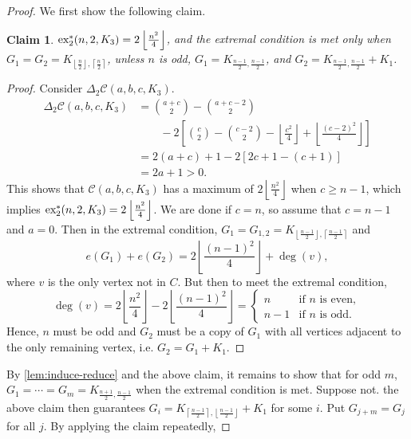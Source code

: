 \documentclass[12pt]{report}
\newtheorem{claim}{Claim}[theorem]
\newcommand*{\dex}{\textnormal{ex}_2}
\newcommand*{\con}{\mathcal{C}}
\begin{document}
\begin{proof}
  
  We first show the following claim.

  \begin{claim}\label{claim:induce-triangle}
    $\dex^*(n, 2, K_3) = 2\left\lfloor\frac{n^2}{4}\right\rfloor$, and the extremal condition is met only when $G_1 = G_2 = K_{\left\lfloor\frac{n}{2}\right\rfloor, \left\lceil\frac{n}{2}\right\rceil}$, unless $n$ is odd, $G_1 = K_{\frac{n - 1}{2}, \frac{n - 1}{2}}$, and $G_2 = K_{\frac{n - 1}{2}, \frac{n - 1}{2}} + K_1$.
  \end{claim}

  \begin{proof}
    Consider $\Delta_2 \con(a, b, c, K_3)$.
    \begin{align*}
      \Delta_2 \con(a, b, c, K_3)
      &= \binom{a + c}{2} - \binom{a + c - 2}{2} \\
      &\qquad - 2\left[\binom{c}{2} - \binom{c - 2}{2} - \left\lfloor\frac{c^2}{4}\right\rfloor + \left\lfloor\frac{(c - 2)^2}{4}\right\rfloor\right] \\
      &= 2(a + c) + 1 - 2[2c + 1 - (c + 1)] \\
      &= 2a + 1 > 0.
    \end{align*}
    This shows that $\con(a, b, c, K_3)$ has a maximum of $2\left\lfloor \frac{n^2}{4} \right\rfloor$ when $c \geq n - 1$, which implies $\dex^*(n, 2, K_3) = 2\left\lfloor\frac{n^2}{4}\right\rfloor$. We are done if $c = n$, so assume that $c = n - 1$ and $a = 0$. Then in the extremal condition, $G_1 = G_{1, 2} = K_{\left\lfloor\frac{n - 1}{2}\right\rfloor, \left\lceil\frac{n - 1}{2}\right\rceil}$ and
    \[
      e(G_1) + e(G_2) = 2\left\lfloor\frac{(n - 1)^2}{4}\right\rfloor + \deg(v),
    \]
    where $v$ is the only vertex not in $C$. But then to meet the extremal condition, 
    \[
      \deg(v) = 2\left\lfloor\frac{n^2}{4}\right\rfloor - 2\left\lfloor\frac{(n - 1)^2}{4}\right\rfloor = \begin{cases}
        n & \text{if $n$ is even}, \\
        n - 1 & \text{if $n$ is odd}.
      \end{cases}
    \]
    Hence, $n$ must be odd and $G_2$ must be a copy of $G_1$ with all vertices adjacent to the only remaining vertex, i.e. $G_2 = G_1 + K_1$.
  \end{proof}
  By \cref{lem:induce-reduce} and the above claim, it remains to show that for odd $m$, $G_1 = \cdots = G_m = K_{\frac{n + 1}{2}, \frac{n - 1}{2}}$ when the extremal condition is met. Suppose not. the above claim then guarantees $G_i = K_{\left\lceil\frac{n - 1}{2}\right\rceil, \left\lfloor\frac{n - 1}{2}\right\rfloor} + K_1$ for some $i$. Put $G_{j + m} = G_j$ for all $j$. By applying the claim repeatedly, 

\end{proof}
\end{document}
